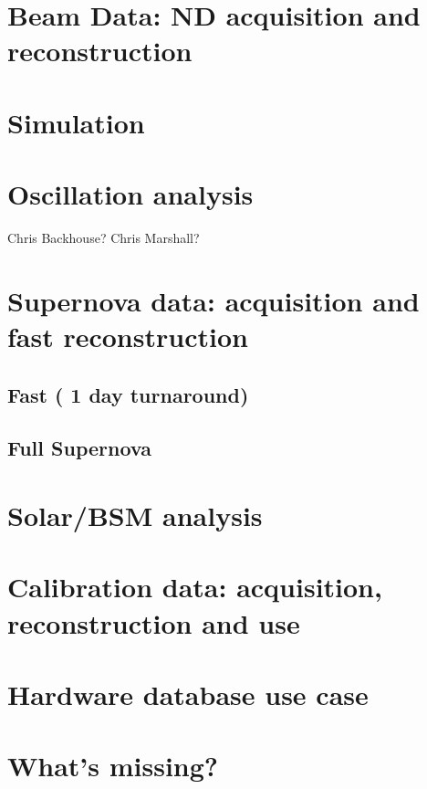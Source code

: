 \section{Beam Data: ND acquisition and reconstruction}
\label{sec:use:ndbeam}  %

\section{Simulation}   

\section{Oscillation analysis} Chris Backhouse?  Chris Marshall? 
\label{sec:use:osc}

\section{Supernova data: acquisition and fast reconstruction}
\label{sec:use:supernova}  %

\subsection{Fast ( 1 day turnaround)} 

\subsection{Full Supernova}

\section{Solar/BSM analysis}
\label{sec:use:BSManalysis}

\section{Calibration data: acquisition, reconstruction and use}
\label{sec:use:calib}  %

\section{Hardware database use case} 
\label{sec:use:hdb} 

\section{What's missing?}
\label{sec:use:todo}






